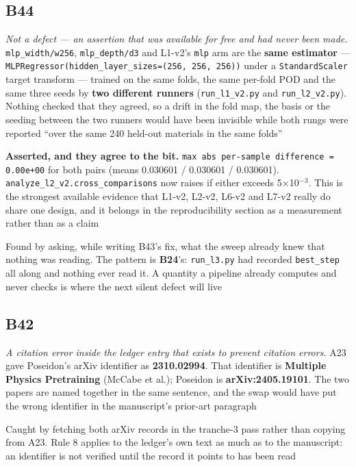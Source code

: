\documentclass[10pt]{article}
\begin{document}
\subsection*{B44}\label{led:B44}
\begin{description}[leftmargin=0pt,itemsep=1pt]
\item[Defect.] \emph{Not a defect --- an assertion that was available for free and had never been made.} \texttt{mlp\_width/w256}, \texttt{mlp\_depth/d3} and L1-v2's \texttt{mlp} arm are the \textbf{same estimator} --- \texttt{MLPRegressor(hidden\_layer\_sizes=(256, 256, 256))} under a \texttt{StandardScaler} target transform --- trained on the same folds, the same per-fold POD and the same three seeds by \textbf{two different runners} (\texttt{run\_l1\_v2.py} and \texttt{run\_l2\_v2.py}). Nothing checked that they agreed, so a drift in the fold map, the basis or the seeding between the two runners would have been invisible while both rungs were reported ``over the same 240 held-out materials in the same folds''
\item[Resolution.] \textbf{Asserted, and they agree to the bit.} \texttt{max abs per-sample difference = 0.00e+00} for both pairs (means 0.030601 / 0.030601 / 0.030601). \texttt{analyze\_l2\_v2.cross\_comparisons} now raises if either exceeds 5$\times$10$^{-}$$^3$. This is the strongest available evidence that L1-v2, L2-v2, L6-v2 and L7-v2 really do share one design, and it belongs in the reproducibility section as a measurement rather than as a claim
\item[Note.] Found by asking, while writing B43's fix, what the sweep already knew that nothing was reading. The pattern is \textbf{B24}'s: \texttt{run\_l3.py} had recorded \texttt{best\_step} all along and nothing ever read it. A quantity a pipeline already computes and never checks is where the next silent defect will live
\end{description}
\subsection*{B42}\label{led:B42}
\begin{description}[leftmargin=0pt,itemsep=1pt]
\item[Defect.] \emph{A citation error inside the ledger entry that exists to prevent citation errors.} A23 gave Poseidon's arXiv identifier as \textbf{2310.02994}. That identifier is \textbf{Multiple Physics Pretraining} (McCabe et al.); Poseidon is \textbf{arXiv:2405.19101}. The two papers are named together in the same sentence, and the swap would have put the wrong identifier in the manuscript's prior-art paragraph
\item[How it was caught.] Caught by fetching both arXiv records in the tranche-3 pass rather than copying from A23. Rule 8 applies to the ledger's own text as much as to the manuscript: an identifier is not verified until the record it points to has been read
\end{description}
\end{document}
